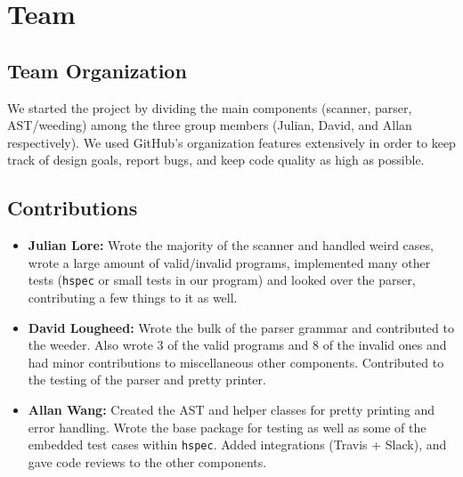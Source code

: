 \documentclass[11pt]{article}
\begin{document}
\section{Team}
\label{sec:orgf1d5995}
\subsection{Team Organization}
\label{sec:org62c171d}
We started the project by dividing the main components (scanner, parser,
AST/weeding) among the three group members (Julian, David, and Allan
respectively). We used GitHub's organization features extensively in
order to keep track of design goals, report bugs, and keep code quality
as high as possible.
\subsection{Contributions}
\label{sec:orgc33910c}
\begin{itemize}
\item \textbf{Julian Lore:} Wrote the majority of the scanner and handled weird
cases, wrote a large amount of valid/invalid programs, implemented
many other tests (\texttt{hspec} or small tests in our program) and looked
over the parser, contributing a few things to it as well.
\item \textbf{David Lougheed:} Wrote the bulk of the parser grammar and contributed to
the weeder. Also wrote 3 of the valid programs and 8 of the
invalid ones and had minor contributions to miscellaneous other components.
Contributed to the testing of the parser and pretty printer.
\item \textbf{Allan Wang:} Created the AST and helper classes for pretty printing
and error handling.  Wrote the base package for testing as well as
some of the embedded test cases within \texttt{hspec}.  Added integrations
(Travis + Slack), and gave code reviews to the other components.
\end{itemize}
\end{document}
